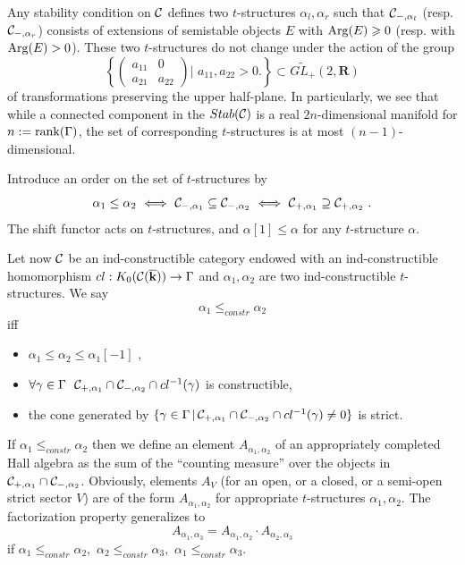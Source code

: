 \documentclass[12pt]{article}
\begin{document}
 Any stability condition on $\cal C$ defines two $t$-structures $\alpha_l,\alpha_r$
  such that ${\cal C}_{-,\alpha_l}$ (resp. ${\cal C}_{-,\alpha_r}$) consists of extensions of semistable objects $E$ with $\operatorname{Arg}(E)\geqslant 0$ (resp. with $\operatorname{Arg}(E)>0$).
  These two $t$-structures do not change under the action of the group
  $$\left\{\left( 
  \begin{array}
  {cc} a_{11} & 0\\ a_{21} & a_{22}
  \end{array}\right) \bigl|\,\, a_{11},a_{22}>0\bigr.\right\}\subset \widetilde{GL_+}(2,\mathbf{R})$$
  of transformations preserving the upper half-plane.
  In particularly, we see that while a connected component
  in the $Stab({\cal C})$ is a real $2n$-dimensional manifold for $n:=\operatorname{rank}(\Gamma)$,
   the set of corresponding $t$-structures is at most $(n-1)$-dimensional. 
  
  
 Introduce an order on the set of $t$-structures by
 $$\alpha_1\le \alpha_2\,\,\Longleftrightarrow \,\,{\cal C}_{-,\alpha_1}\subseteq {\cal C}_{-,\alpha_2}\,\,\Longleftrightarrow\,\, {\cal C}_{+,\alpha_1}\supseteq {\cal C}_{+,\alpha_2}\,\,.$$
 The shift functor acts on $t$-structures, and 
 $\alpha[1]\le \alpha$ for any $t$-structure $\alpha$. 
 
 
 Let now $\cal C$ be an ind-constructible category endowed with an 
 ind-constructible homomorphism $cl:K_0({\cal C}(\overline{\bf k}))\to \Gamma$
  and $\alpha_1,\alpha_2$
 are two ind-constructible $t$-structures. We say
  $$\alpha_1\le_{constr}\alpha_2$$
  iff 
  \begin{itemize}
  \item $\alpha_1\le \alpha_2\le \alpha_1[-1]\,\,,$
  \item $\forall\gamma\in \Gamma\,\,\,\,
    {\cal C}_{+,\alpha_1}\cap{\cal C}_{-,\alpha_2}\cap cl^{-1}(\gamma)$ is constructible,
    \item the cone generated by $\{\gamma\in \Gamma\,| \,{\cal C}_{+,\alpha_1}\cap{\cal C}_{-,\alpha_2}\cap cl^{-1}(\gamma)\ne 0\}$ is strict.
    \end{itemize}
    If $\alpha_1\le_{constr}\alpha_2$ then we define
   an element $A_{\alpha_1,\alpha_2}$ of an appropriately completed Hall
    algebra as the sum of the ``counting measure'' over the objects in
    ${\cal C}_{+,\alpha_1}\cap{\cal C}_{-,\alpha_2}$.
    Obviously, elements $A_V$ (for an open, or a closed, or a semi-open strict sector $V$)
    are of the form $A_{\alpha_1,\alpha_2}$ for  appropriate $t$-structures
     $\alpha_1,\alpha_2$. The factorization property
      generalizes to
      $$A_{\alpha_1,\alpha_3}=A_{\alpha_1,\alpha_2}\cdot A_{\alpha_2,\alpha_3}$$
      if $\alpha_1 \le_{constr}\alpha_2,\,\,\alpha_2\le_{constr}\alpha_3,\,\,\alpha_1\le_{constr}\alpha_3$.
      
\end{document}
